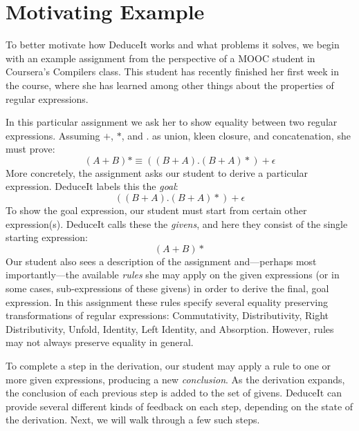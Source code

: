 \documentclass{sigchi}
\begin{document}
\section{Motivating Example}

To better motivate how DeduceIt works and what problems it solves, we begin with an example assignment from the perspective of a MOOC student in Coursera's Compilers class. This student has recently finished her first week in the course, where she has learned among other things about the properties of regular expressions.

In this particular assignment we ask her to show equality between two regular expressions. Assuming $+$, $*$, and $.$ as union, kleen closure, and concatenation, she must prove:
$$(A+B)* \equiv ((B+A).(B+A)*)+\epsilon$$
More concretely, the assignment asks our student to derive a particular expression. DeduceIt labels this the \textit{goal}: 
$$((B+A).(B+A)*)+\epsilon$$ 
To show the goal expression, our student must start from certain other expression(s). DeduceIt calls these the \textit{givens}, and here they consist of the single starting expression: 
$$(A+B)*$$
Our student also sees a description of the assignment and---perhaps most importantly---the available \textit{rules} she may apply on the given expressions (or in some cases, sub-expressions of these givens) in order to derive the final, goal expression. In this assignment these rules specify several equality preserving transformations of regular expressions: Commutativity, Distributivity, Right Distributivity, Unfold, Identity, Left Identity, and Absorption. However, rules may not always preserve equality in general.

To complete a step in the derivation, our student may apply a rule to one or more given expressions, producing a new \textit{conclusion}. As the derivation expands, the conclusion of each previous step is added to the set of givens. DeduceIt can provide several different kinds of feedback on each step, depending on the state of the derivation. Next, we will walk through a few such steps.
\end{document}
